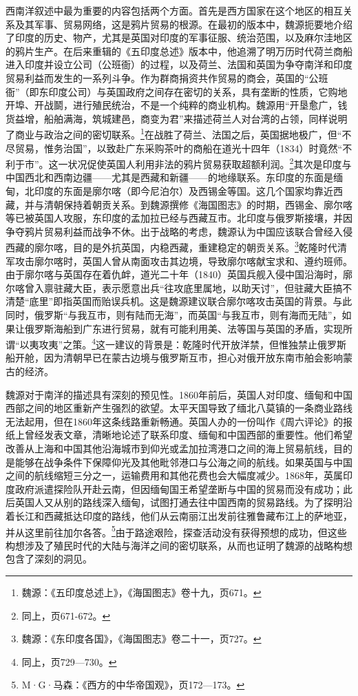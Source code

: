\documentclass[a4paper, 12pt, openright]{ctexbook}
\begin{document}
西南洋叙述中最为重要的内容包括两个方面。首先是西方国家在这个地区的相互关系及其军事、贸易网络，这是鸦片贸易的根源。在最初的版本中，魏源扼要地介绍了印度的历史、物产，尤其是英国对印度的军事征服、统治范围，以及麻尔洼地区的鸦片生产。在后来重辑的《五印度总述》版本中，他追溯了明万历时代荷兰商船进入印度并设立公司（公班衙）的过程，以及荷兰、法国和英国为争夺南洋和印度贸易利益而发生的一系列斗争。作为群商捐资共作贸易的商会，英国的“公班衙”（即东印度公司）与英国政府之间存在密切的关系，具有垄断的性质，它购地开埠、开战鬬，进行殖民统治，不是一个纯粹的商业机构。魏源用“开垦愈广，钱货益增，船舶满海，筑城建邑，商变为君”来描述荷兰人对台湾的占领，同样说明了商业与政治之间的密切联系。\footnote{魏源：《五印度总述上》，《海国图志》卷十九，页671。}在战胜了荷兰、法国之后，英国据地极广，但“不尽贸易，惟务治国”，以致赴广东采购茶叶的商船在道光十四年（1834）时竟然“不利于市”。这一状况促使英国人利用非法的鸦片贸易获取超额利润。\footnote{同上，页671-672。}其次是印度与中国西北和西南边疆——尤其是西藏和新疆——的地缘联系。东印度的东面是缅甸，北印度的东面是廓尔喀（即今尼泊尔）及西锡金等国。这几个国家均靠近西藏，并与清朝保持着朝贡关系。到魏源撰修《海国图志》的时期，西锡金、廓尔喀等已被英国人攻服，东印度的孟加拉已经与西藏互市。北印度与俄罗斯接壤，并因争夺鸦片贸易利益而战争不休。出于战略的考虑，魏源认为中国应该联合曾经入侵西藏的廓尔喀，目的是外抗英国，内稳西藏，重建稳定的朝贡关系。\footnote{魏源：《东印度各国》，《海国图志》卷二十一，页727。}乾隆时代清军攻击廓尔喀时，英国人曾从南面攻击其边境，导致廓尔喀献宝求和、遵约班师。由于廓尔喀与英国存在着仇衅，道光二十年（1840）英国兵舰入侵中国沿海时，廓尔喀曾入禀驻藏大臣，表示愿意出兵“往攻底里属地，以助天讨”，但驻藏大臣搞不清楚“底里”即指英国而贻误兵机。这是魏源建议联合廓尔喀攻击英国的背景。与此同时，俄罗斯“与我互市，则有陆而无海”，而英国“与我互市，则有海而无陆”，如果让俄罗斯海船到广东进行贸易，就有可能利用美、法等国与英国的矛盾，实现所谓“以夷攻夷”之策。\footnote{同上，页729—730。}这一建议的背景是：乾隆时代开放洋禁，但惟独禁止俄罗斯船开舱，因为清朝早已在蒙古边境与俄罗斯互市，担心对俄开放东南市舶会影响蒙古的经济。

魏源对于南洋的描述具有深刻的预见性。1860年前后，英国人对印度、缅甸和中国西部之间的地区重新产生强烈的欲望。太平天国导致了缅北八莫镇的一条商业路线无法起用，但在1860年这条线路重新畅通。英国人办的一份叫作《周六评论》的报纸上曾经发表文章，清晰地论述了联系印度、缅甸和中国西部的重要性。他们希望改善从上海和中国其他沿海城市到仰光或孟加拉湾港口之间的海上贸易航线，目的是能够在战争条件下保障仰光及其他毗邻港口与公海之间的航线。如果英国与中国之间的航线缩短三分之一，运输费用和其他花费也会大幅度减少。1868年，英属印度政府派遣探险队开赴云南，但因缅甸国王希望垄断与中国的贸易而没有成功；此后英国人又从别的路线深入缅甸，试图打通去往中国西南的贸易路线。为了探明沿着长江和西藏抵达印度的路线，他们从云南丽江出发前往雅鲁藏布江上的萨地亚，并从这里前往加尔各答。\footnote{M·G·马森：《西方的中华帝国观》，页172—173。}由于路途艰险，探查活动没有获得预想的成功，但这些构想涉及了殖民时代的大陆与海洋之间的密切联系，从而也证明了魏源的战略构想包含了深刻的洞见。
\end{document}
